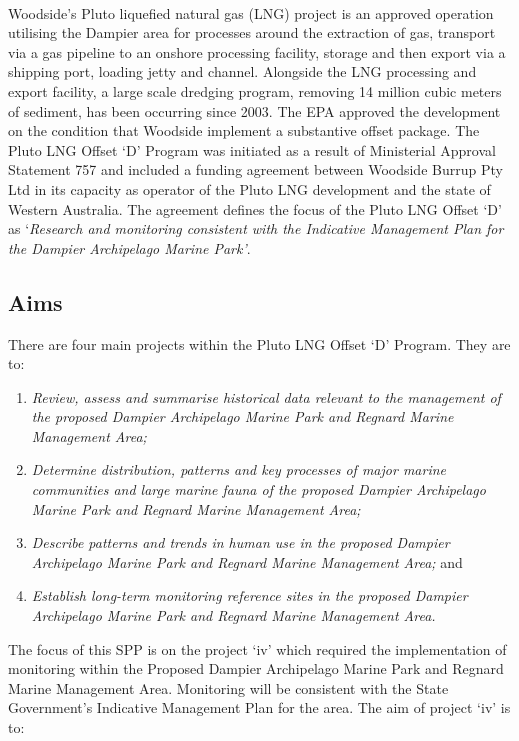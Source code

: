 \documentclass[version=last,
    paper=a4,                               %
    10pt,                                   %
    dvipsnames,
    oneside,                              %
    headings=openany,                       %
    open=any,
    BCOR=7mm,                               %
    DIV=15,     %
]{scrbook}
\providecommand{\tightlist}{\setlength{\itemsep}{0pt}\setlength{\parskip}{0pt}}
\begin{document}
~

Woodside's Pluto liquefied natural gas (LNG) project is an approved
operation utilising the Dampier area for processes around the extraction
of gas, transport via a gas pipeline to an onshore processing facility,
storage and then export via a shipping port, loading jetty and channel.
Alongside the LNG processing and export facility, a large scale dredging
program, removing 14 million cubic meters of sediment, has been
occurring since 2003. The EPA approved the development on the condition
that Woodside implement a substantive offset package. The Pluto LNG
Offset `D' Program was initiated as a result of Ministerial Approval
Statement 757 and included a funding agreement between Woodside Burrup
Pty Ltd in its capacity as operator of the Pluto LNG development and the
state of Western Australia. The agreement defines the focus of the Pluto
LNG Offset `D' as `\emph{Research and monitoring consistent with the
Indicative Management Plan for the Dampier Archipelago Marine Park'}.




\subsection*{Aims}

There are four main projects within the Pluto LNG Offset `D' Program.
They are to:

\begin{enumerate}
\def\labelenumi{\roman{enumi}.}
\tightlist
\item
  \emph{Review, assess and summarise historical data relevant to the
  management of the proposed Dampier Archipelago Marine Park and Regnard
  Marine Management Area;}
\item
  \emph{Determine distribution, patterns and key processes of major
  marine communities and large marine fauna of the proposed Dampier
  Archipelago Marine Park and Regnard Marine Management Area;}
\item
  \emph{Describe patterns and trends in human use in the proposed
  Dampier Archipelago Marine Park and Regnard Marine Management Area;}
  and
\item
  \emph{Establish long-term monitoring reference sites in the proposed
  Dampier Archipelago Marine Park and Regnard Marine Management Area.}
\end{enumerate}

The focus of this SPP is on the project `iv' which required the
implementation of monitoring within the Proposed Dampier Archipelago
Marine Park and Regnard Marine Management Area. Monitoring will be
consistent with the State Government's Indicative Management Plan for
the area. The aim of project `iv' is to:
\end{document}
